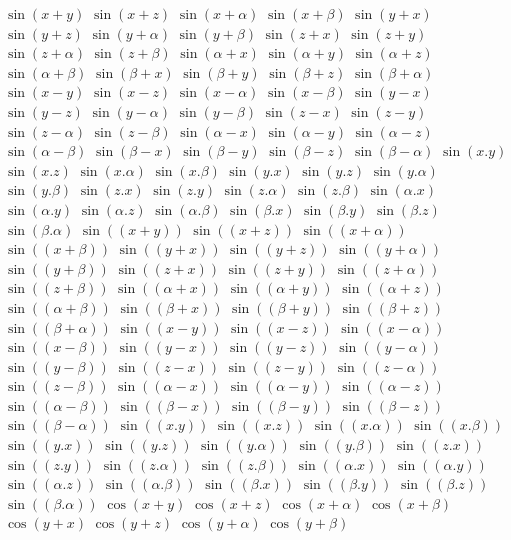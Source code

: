 $ \sin(x + y) $
$ \sin(x + z) $
$ \sin(x + \alpha) $
$ \sin(x + \beta) $
$ \sin(y + x) $
$ \sin(y + z) $
$ \sin(y + \alpha) $
$ \sin(y + \beta) $
$ \sin(z + x) $
$ \sin(z + y) $
$ \sin(z + \alpha) $
$ \sin(z + \beta) $
$ \sin(\alpha + x) $
$ \sin(\alpha + y) $
$ \sin(\alpha + z) $
$ \sin(\alpha + \beta) $
$ \sin(\beta + x) $
$ \sin(\beta + y) $
$ \sin(\beta + z) $
$ \sin(\beta + \alpha) $
$ \sin(x - y) $
$ \sin(x - z) $
$ \sin(x - \alpha) $
$ \sin(x - \beta) $
$ \sin(y - x) $
$ \sin(y - z) $
$ \sin(y - \alpha) $
$ \sin(y - \beta) $
$ \sin(z - x) $
$ \sin(z - y) $
$ \sin(z - \alpha) $
$ \sin(z - \beta) $
$ \sin(\alpha - x) $
$ \sin(\alpha - y) $
$ \sin(\alpha - z) $
$ \sin(\alpha - \beta) $
$ \sin(\beta - x) $
$ \sin(\beta - y) $
$ \sin(\beta - z) $
$ \sin(\beta - \alpha) $
$ \sin(x . y) $
$ \sin(x . z) $
$ \sin(x . \alpha) $
$ \sin(x . \beta) $
$ \sin(y . x) $
$ \sin(y . z) $
$ \sin(y . \alpha) $
$ \sin(y . \beta) $
$ \sin(z . x) $
$ \sin(z . y) $
$ \sin(z . \alpha) $
$ \sin(z . \beta) $
$ \sin(\alpha . x) $
$ \sin(\alpha . y) $
$ \sin(\alpha . z) $
$ \sin(\alpha . \beta) $
$ \sin(\beta . x) $
$ \sin(\beta . y) $
$ \sin(\beta . z) $
$ \sin(\beta . \alpha) $
$ \sin((x + y)) $
$ \sin((x + z)) $
$ \sin((x + \alpha)) $
$ \sin((x + \beta)) $
$ \sin((y + x)) $
$ \sin((y + z)) $
$ \sin((y + \alpha)) $
$ \sin((y + \beta)) $
$ \sin((z + x)) $
$ \sin((z + y)) $
$ \sin((z + \alpha)) $
$ \sin((z + \beta)) $
$ \sin((\alpha + x)) $
$ \sin((\alpha + y)) $
$ \sin((\alpha + z)) $
$ \sin((\alpha + \beta)) $
$ \sin((\beta + x)) $
$ \sin((\beta + y)) $
$ \sin((\beta + z)) $
$ \sin((\beta + \alpha)) $
$ \sin((x - y)) $
$ \sin((x - z)) $
$ \sin((x - \alpha)) $
$ \sin((x - \beta)) $
$ \sin((y - x)) $
$ \sin((y - z)) $
$ \sin((y - \alpha)) $
$ \sin((y - \beta)) $
$ \sin((z - x)) $
$ \sin((z - y)) $
$ \sin((z - \alpha)) $
$ \sin((z - \beta)) $
$ \sin((\alpha - x)) $
$ \sin((\alpha - y)) $
$ \sin((\alpha - z)) $
$ \sin((\alpha - \beta)) $
$ \sin((\beta - x)) $
$ \sin((\beta - y)) $
$ \sin((\beta - z)) $
$ \sin((\beta - \alpha)) $
$ \sin((x . y)) $
$ \sin((x . z)) $
$ \sin((x . \alpha)) $
$ \sin((x . \beta)) $
$ \sin((y . x)) $
$ \sin((y . z)) $
$ \sin((y . \alpha)) $
$ \sin((y . \beta)) $
$ \sin((z . x)) $
$ \sin((z . y)) $
$ \sin((z . \alpha)) $
$ \sin((z . \beta)) $
$ \sin((\alpha . x)) $
$ \sin((\alpha . y)) $
$ \sin((\alpha . z)) $
$ \sin((\alpha . \beta)) $
$ \sin((\beta . x)) $
$ \sin((\beta . y)) $
$ \sin((\beta . z)) $
$ \sin((\beta . \alpha)) $
$ \cos(x + y) $
$ \cos(x + z) $
$ \cos(x + \alpha) $
$ \cos(x + \beta) $
$ \cos(y + x) $
$ \cos(y + z) $
$ \cos(y + \alpha) $
$ \cos(y + \beta) $
